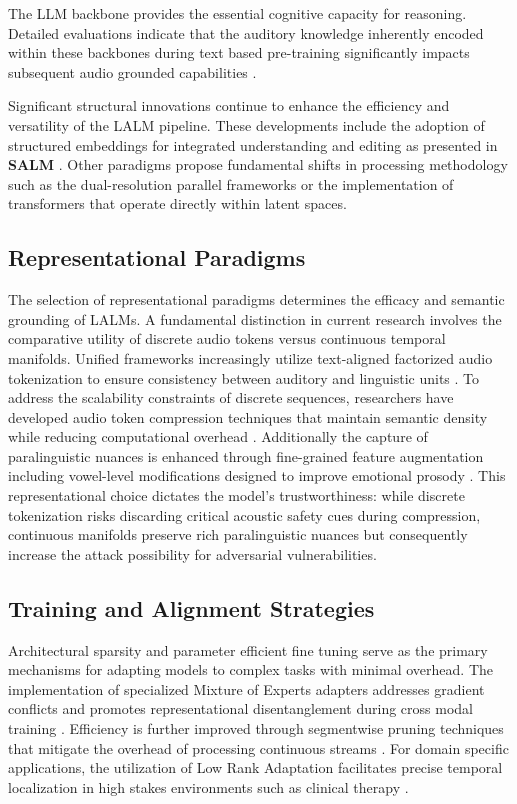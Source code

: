 \documentclass{llmxive}
\begin{document}
The LLM backbone provides the essential cognitive capacity for reasoning. Detailed evaluations indicate that the auditory knowledge inherently encoded within these backbones during text based pre-training significantly impacts subsequent audio grounded capabilities \cite{lu2026how}.

Significant structural innovations continue to enhance the efficiency and versatility of the LALM pipeline. These developments include the adoption of structured embeddings for integrated understanding and editing as presented in \textbf{SALM} \cite{hu2025salm}. Other paradigms propose fundamental shifts in processing methodology such as the dual-resolution parallel frameworks or the implementation of transformers that operate directly within latent spaces\cite{lu2025latent}.

\subsection{Representational Paradigms}
The selection of representational paradigms determines the efficacy and semantic grounding of LALMs. A fundamental distinction in current research involves the comparative utility of discrete audio tokens versus continuous temporal manifolds. Unified frameworks increasingly utilize text-aligned factorized audio tokenization to ensure consistency between auditory and linguistic units \cite{yang2026uniaudio}. To address the scalability constraints of discrete sequences, researchers have developed audio token compression techniques that maintain semantic density while reducing computational overhead \cite{bhati2025towards}. Additionally the capture of paralinguistic nuances is enhanced through fine-grained feature augmentation including vowel-level modifications designed to improve emotional prosody \cite{wang2026vowelprompt}. This representational choice dictates the model's trustworthiness: while discrete tokenization risks discarding critical acoustic safety cues during compression, continuous manifolds preserve rich paralinguistic nuances but consequently increase the attack possibility for adversarial vulnerabilities.

\subsection{Training and Alignment Strategies}
Architectural sparsity and parameter efficient fine tuning serve as the primary mechanisms for adapting models to complex tasks with minimal overhead. The implementation of specialized Mixture of Experts adapters addresses gradient conflicts and promotes representational disentanglement during cross modal training \cite{lei2026moe}. Efficiency is further improved through segmentwise pruning techniques that mitigate the overhead of processing continuous streams \cite{gibier2025segmentwise}. For domain specific applications, the utilization of Low Rank Adaptation facilitates precise temporal localization in high stakes environments such as clinical therapy \cite{bn2025fine}.
\end{document}
